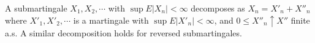 A submartingale $X_1, X_2, \cdots$ with $\sup E|X_n| < \infty$ decomposes as $X_n = X'_n + X''_n$ where $X'_1, X'_2, \cdots$ is a martingale with $\sup E|X'_n| < \infty$, and $0 \leq X''_n \uparrow X''$ finite a.s. A similar decomposition holds for reversed submartingales.
